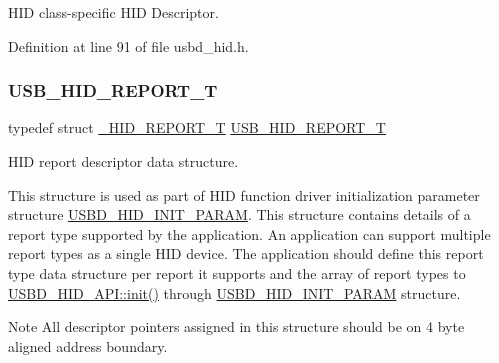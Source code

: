 H\+ID class-\/specific H\+ID Descriptor. 

Definition at line 91 of file usbd\+\_\+hid.\+h.

\mbox{\label{group___u_s_b_d___h_i_d_gaaa1686adb431783ea4357e6899c0d39d}} 
\subsubsection{\texorpdfstring{U\+S\+B\+\_\+\+H\+I\+D\+\_\+\+R\+E\+P\+O\+R\+T\+\_\+T}{USB\_HID\_REPORT\_T}}
{\footnotesize\ttfamily typedef struct \hyperlink{struct___h_i_d___r_e_p_o_r_t___t}{\+\_\+\+H\+I\+D\+\_\+\+R\+E\+P\+O\+R\+T\+\_\+T}  \hyperlink{group___u_s_b_d___h_i_d_gaaa1686adb431783ea4357e6899c0d39d}{U\+S\+B\+\_\+\+H\+I\+D\+\_\+\+R\+E\+P\+O\+R\+T\+\_\+T}}



H\+ID report descriptor data structure. 

This structure is used as part of H\+ID function driver initialization parameter structure \hyperlink{struct_u_s_b_d___h_i_d___i_n_i_t___p_a_r_a_m}{U\+S\+B\+D\+\_\+\+H\+I\+D\+\_\+\+I\+N\+I\+T\+\_\+\+P\+A\+R\+AM}. This structure contains details of a report type supported by the application. An application can support multiple report types as a single H\+ID device. The application should define this report type data structure per report it supports and the array of report types to \hyperlink{struct_u_s_b_d___h_i_d___a_p_i_a7b98c434713f1deb07abafcb52fae76d}{U\+S\+B\+D\+\_\+\+H\+I\+D\+\_\+\+A\+P\+I\+::init()} through \hyperlink{struct_u_s_b_d___h_i_d___i_n_i_t___p_a_r_a_m}{U\+S\+B\+D\+\_\+\+H\+I\+D\+\_\+\+I\+N\+I\+T\+\_\+\+P\+A\+R\+AM} structure.

\begin{DoxyNote}{Note}
All descriptor pointers assigned in this structure should be on 4 byte aligned address boundary. 
\end{DoxyNote}
\mbox{\label{group___u_s_b_d___h_i_d_ga48d7b7f66a852d99dfbe2c419cc408ba}} 
